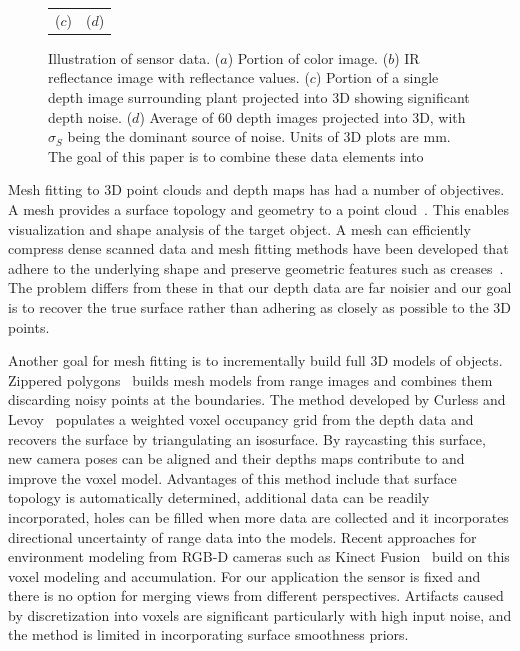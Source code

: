 \begin{figure}
\begin{center}
\begin{tabular}{ c c }
($c$) & ($d$) \\
\end{tabular}
\end{center}
\caption{Illustration of sensor data.  ($a$) Portion of color image. ($b$) IR reflectance image with reflectance values. ($c$) Portion of a single depth image surrounding plant projected into $3$D showing significant depth noise. ($d$) Average of 60 depth images projected into $3$D, with $\sigma_S$ being the dominant source of noise.  Units of $3$D plots are mm.  The goal of this paper is to combine these data elements into }
\label{fig:plantnoise}
\end{figure}



Mesh fitting to $3$D point clouds and depth maps has had a number of objectives.  A mesh provides a surface topology and geometry to a point cloud~\cite{Sienz2000,Yeh2011}.  This enables visualization and shape analysis of the target object.  A mesh can efficiently compress dense scanned data and mesh fitting methods have been developed that adhere to the underlying shape and preserve geometric features such as creases~\cite{hoppe:1994,Kobbelt:1998}.  The problem differs from these in that our depth data are far noisier and our goal is to recover the true surface rather than adhering as closely as possible to the 3D points.

Another goal for mesh fitting is to incrementally build full $3$D models of objects.  Zippered polygons~\cite{Turk1994} builds mesh models from range images and combines them discarding noisy points at the boundaries.  The method developed by Curless and Levoy~\cite{Curless:1996} populates a weighted voxel occupancy grid from the depth data and recovers the surface by triangulating an isosurface.  By raycasting this surface, new camera poses can be aligned and their depths maps contribute to and improve the voxel model.  Advantages of this method include that surface topology is automatically determined, additional data can be readily incorporated, holes can be filled when more data are collected and it incorporates directional uncertainty of range data into the models.  Recent approaches for environment modeling from RGB-D cameras such as Kinect Fusion~\cite{Izadi:2011,Newcombe:2011} build on this voxel modeling and accumulation.  For our application the sensor is fixed and there is no option for merging views from different perspectives.  Artifacts caused by discretization into voxels are significant particularly with high input noise, and the method is limited in incorporating surface smoothness priors.

